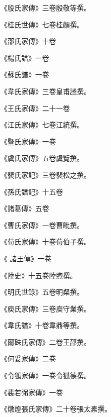 \begin{pinyinscope}
 《殷氏家傳》三卷殷敬等撰。



 《桂氏世傳》七卷桂顏撰。



 《邵氏家傳》十卷



 《楊氏譜》一卷



 《蘇氏譜》一卷



 《韋氏家傳》三卷皇甫謐撰。



 《王氏家傳》二十一卷



 《江氏家傳》七卷江統撰。



 《暨氏家傳》一卷



 《虞氏家傳》五卷虞覽撰。



 《裴氏家記》三卷裴松之撰。



 《孫氏譜記》十五卷



 《諸葛傳》五卷



 《曹氏家傳》一卷曹毗撰。



 《荀氏家傳》十卷荀伯子撰。



 《
 諸王傳》一卷



 《陸史》十五卷陸煦撰。



 《明氏世錄》五卷明粲撰。



 《庾氏家傳》三卷庾守業撰。



 《韋氏譜》十卷韋鼎等撰。



 《爾硃氏家傳》二卷王邵撰。



 《何妥家傳》二卷



 《令狐家傳》一卷令狐德撰。



 《裴若弼家傳》一卷



 《燉煌張氏家傳》二十卷張太素撰。




\end{pinyinscope}
